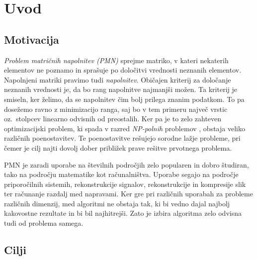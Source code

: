 \chapter{Uvod}
\section{Motivacija}
\textit{Problem matričnih napolnitev (PMN)} sprejme matriko, v kateri nekaterih elementov ne poznamo in sprašuje po določitvi vrednosti neznanih elementov. Napolnjeni matriki pravimo tudi \textit{napolnitev}. Običajen kriterij za določanje neznanih vrednosti je, da bo rang napolnitve najmanjši možen.
Ta kriterij je smiseln, ker želimo, da se napolnitev čim bolj prilega znanim podatkom. To pa dosežemo ravno z minimizacijo ranga, saj bo v tem primeru največ vrstic oz.\ stolpcev linearno odvisnih od preostalih.
Ker pa je to zelo zahteven optimizacijski problem, ki spada v razred \textit{NP-polnih} problemov \cite{Survey-NKS19},
obstaja veliko različnih poenostavitev.
Te poenostavitve rešujejo sorodne lažje probleme, pri čemer je cilj najti dovolj dober približek prave rešitve prvotnega problema. 

PMN je zaradi uporabe na številnih področjih zelo
popularen in dobro študiran, tako na področju matematike kot računalništva.
Uporabe segajo na področje priporočilnih sistemih, rekonstrukcije signalov, rekonstrukcije in kompresije slik ter računanje razdalj med napravami.
Ker gre pri različnih uporabah za probleme različnih dimenzij, med algoritmi ne obstaja tak, ki bi vedno dajal najbolj kakovostne rezultate in bi bil najhitrejši. Zato je izbira algoritma zelo odvisna tudi od problema samega. 

\iffalse
\CG{Algoritme testiramo in primerjamo na problemih razreševanja neznanih pikslov v slikah. Videli bomo, da poznamo boljše algoritme, ki rešujejo ta problem. Ker pa potrebujemo za izračun napake nezašumljeno matriko, je ta vrsta podatkov primerna. Tudi literatura za namene testiranja uporablja slike ali pa naključno generirane podatke. Ker pa lahko slike tudi vizualno opazujemo, se v diplomskem delu osredotočamo na te.} 

V diplomi bomo predstavili par algoritmov, ki rešujejo omenjen problem ter pokazali in razložili njihove ideje. Algoritmi so bili izbrani glede na njihovo popularnost in priznanost v literaturi. Prav tako poskrbimo, da so algoritmi primerno različni in temeljijo na drugačnih principih.
\fi

\section{Cilji}

